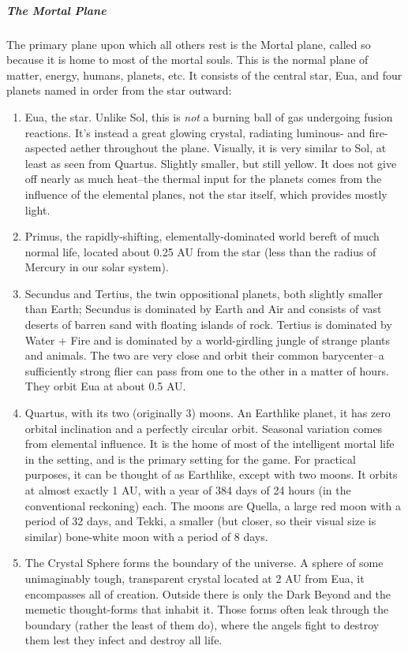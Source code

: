 \subparagraph*{The Mortal Plane}
The primary plane upon which all others rest is the Mortal plane, called so because it is home to most of the mortal souls. This is the normal plane of matter, energy, humans, planets, etc. It consists of the central star, Eua, and four planets named in order from the star outward:
\begin{enumerate}
	\item Eua, the star. Unlike Sol, this is \textit{not} a burning ball of gas undergoing fusion reactions. It's instead a great glowing crystal, radiating luminous- and fire-aspected aether throughout the plane. Visually, it is very similar to Sol, at least as seen from Quartus. Slightly smaller, but still yellow. It does not give off nearly as much heat--the thermal input for the planets comes from the influence of the elemental planes, not the star itself, which provides mostly light.
	\item Primus, the rapidly-shifting, elementally-dominated world bereft of much normal life, located about 0.25 AU from the star (less than the radius of Mercury in our solar system).
	\item Secundus and Tertius, the twin oppositional planets, both slightly smaller than Earth; Secundus is dominated by Earth and Air and consists of vast deserts of barren sand with floating islands of rock. Tertius is dominated by Water + Fire and is dominated by a world-girdling jungle of strange plants and animals. The two are very close and orbit their common barycenter--a sufficiently strong flier can pass from one to the other in a matter of hours. They orbit Eua at about 0.5 AU.
	\item Quartus, with its two (originally 3) moons. An Earthlike planet, it has zero orbital inclination and a perfectly circular orbit. Seasonal variation comes from elemental influence. It is the home of most of the intelligent mortal life in the setting, and is the primary setting for the game. For practical purposes, it can be thought of as Earthlike, except with two moons. It orbits at almost exactly 1 AU, with a year of 384 days of 24 hours (in the conventional reckoning) each. The moons are Quella, a large red moon with a period of 32 days, and Tekki, a smaller (but closer, so their visual size is similar) bone-white moon with a period of 8 days.
	\item The Crystal Sphere forms the boundary of the universe. A sphere of some unimaginably tough, transparent crystal located at 2 AU from Eua, it encompasses all of creation. Outside there is only the Dark Beyond and the memetic thought-forms that inhabit it. Those forms often leak through the boundary (rather the least of them do), where the angels fight to destroy them lest they infect and destroy all life.
\end{enumerate}

